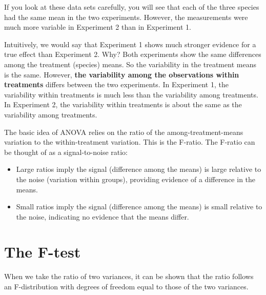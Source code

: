 \documentclass[
  letterpaper,
]{book}
\begin{document}
If you look at these data sets carefully, you will see that each of the
three species had the same mean in the two experiments. However, the
measurements were much more variable in Experiment 2 than in Experiment
1.

\begin{tcolorbox}[enhanced jigsaw, title={Which experiment has better evidence that the true mean NO\(_3\) removal
rate differs between species? \textbf{Pause and think about this before
reading on.}}, opacityback=0, arc=.35mm, coltitle=black, leftrule=.75mm, left=2mm, titlerule=0mm, breakable, colback=white, opacitybacktitle=0.6, colframe=quarto-callout-caution-color-frame, bottomrule=.15mm, colbacktitle=quarto-callout-caution-color!10!white, bottomtitle=1mm, toptitle=1mm, rightrule=.15mm, toprule=.15mm]

Intuitively, we would say that Experiment 1 shows much stronger evidence
for a true effect than Experiment 2. Why? Both experiments show the same
differences among the treatment (species) means. So the variability in
the treatment means is the same. However, \textbf{the variability among
the observations within treatments} differs between the two experiments.
In Experiment 1, the variability within treatments is much less than the
variability among treatments. In Experiment 2, the variability within
treatments is about the same as the variability among treatments.

\end{tcolorbox}

The basic idea of ANOVA relies on the ratio of the among-treatment-means
variation to the within-treatment variation. This is the F-ratio. The
F-ratio can be thought of as a signal-to-noise ratio:

\begin{itemize}
\item
  Large ratios imply the signal (difference among the means) is large
  relative to the noise (variation within groups), providing evidence of
  a difference in the means.
\item
  Small ratios imply the signal (difference among the means) is small
  relative to the noise, indicating no evidence that the means differ.
\end{itemize}

\section{The F-test}\label{the-f-test}

When we take the ratio of two variances, it can be shown that the ratio
follows an F-distribution with degrees of freedom equal to those of the
two variances.
\end{document}
